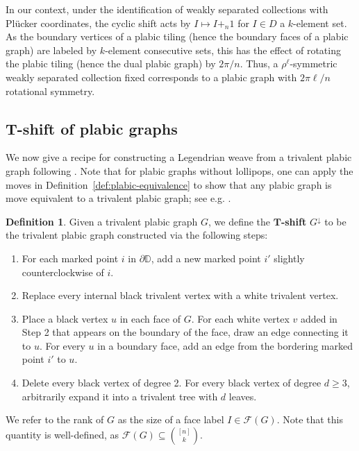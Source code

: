 \documentclass[11pt]{amsart}
\newcommand{\D}{\mathbb{D}}
\theoremstyle{plain}
\theoremstyle{definition}
\newtheorem{definition}[theorem]{Definition}
\begin{document}
In our context, under the identification of weakly separated collections with Pl\"ucker coordinates, the cyclic shift acts by $I\mapsto I+_n 1$ for $I\in D$ a $k$-element set. As the boundary vertices of a plabic tiling (hence the boundary faces of a plabic graph) are labeled by $k$-element consecutive sets, this has the effect of rotating the plabic tiling (hence the dual plabic graph) by $2\pi/n$. Thus, a $\rho^\ell$-symmetric weakly separated collection fixed corresponds to a plabic graph with $2\pi \ell /n$ rotational symmetry. 

\subsection{T-shift of plabic graphs}
We now give a recipe for constructing a Legendrian weave from a trivalent plabic graph following \cite{CLSW2023}. Note that for plabic graphs without lollipops, one can apply the moves in Definition~\ref{def:plabic-equivalence} to show that any plabic graph is move equivalent to a trivalent plabic graph; see e.g. \cite[Lemma 7.4.2]{Fomin7}.


\begin{definition}\label{def:T-shift}
Given a trivalent plabic graph $G$, we define the $\bm{T}$\textbf{-shift} $G^\downarrow$ to be the trivalent plabic graph constructed via the following steps:
\begin{enumerate}
    \item For each marked point $i$ in $\partial \D$, add a new marked point $i'$ slightly counterclockwise of $i$.
    \item Replace every internal black trivalent vertex with a white trivalent vertex.
    \item Place a black vertex $u$ in each face of $G$. For each white vertex $v$ added in Step 2 that appears on the boundary of the face, draw an edge connecting it to $u$. For every $u$ in a boundary face, add an edge from the bordering marked point $i'$ to $u$.
    \item Delete every black vertex of degree 2. For every black vertex of degree $d\geq 3$, arbitrarily expand it into a trivalent tree with $d$ leaves. 
\end{enumerate}
\end{definition}

We refer to the rank of $G$ as the size of a face label $I\in \mathcal{F}(G)$. Note that this quantity is well-defined, as $\mathcal{F}(G)\subseteq {[n] \choose k}$.
\end{document}
